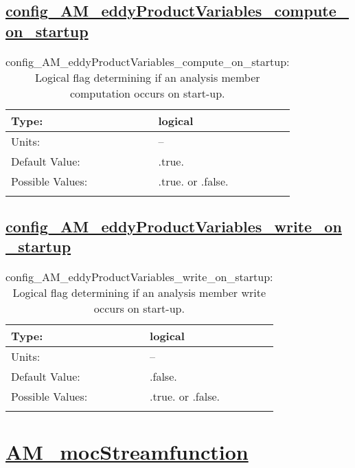 \subsection[config\_AM\_eddyProductVariables\_compute\_on\_startup]{\hyperref[sec:nm_tab_AM_eddyProductVariables]{config\_AM\_eddyProductVariables\_compute\_on\_startup}}
\label{subsec:nm_sec_config_AM_eddyProductVariables_compute_on_startup}
\begin{center}
\begin{longtable}{| p{2.0in} || p{4.0in} |}
    \hline
    Type: & logical \\
    \hline
    Units: & -- \\
    \hline
    Default Value: & .true. \\
    \hline
    Possible Values: & .true. or .false. \\
    \hline
    \caption{config\_AM\_eddyProductVariables\_compute\_on\_startup: Logical flag determining if an analysis member computation occurs on start-up.}
\end{longtable}
\end{center}
\subsection[config\_AM\_eddyProductVariables\_write\_on\_startup]{\hyperref[sec:nm_tab_AM_eddyProductVariables]{config\_AM\_eddyProductVariables\_write\_on\_startup}}
\label{subsec:nm_sec_config_AM_eddyProductVariables_write_on_startup}
\begin{center}
\begin{longtable}{| p{2.0in} || p{4.0in} |}
    \hline
    Type: & logical \\
    \hline
    Units: & -- \\
    \hline
    Default Value: & .false. \\
    \hline
    Possible Values: & .true. or .false. \\
    \hline
    \caption{config\_AM\_eddyProductVariables\_write\_on\_startup: Logical flag determining if an analysis member write occurs on start-up.}
\end{longtable}
\end{center}
\section[AM\_mocStreamfunction]{\hyperref[sec:nm_tab_AM_mocStreamfunction]{AM\_mocStreamfunction}}
\label{sec:nm_sec_AM_mocStreamfunction}
